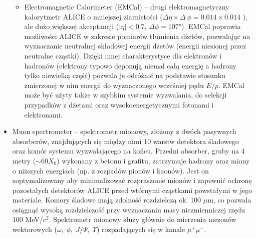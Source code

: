 \begin{itemize}
\begin{itemize}
		\item Electromagnetic Calorimeter (EMCal) -- drugi elektromagnetyczny kalorytmetr ALICE o mniejszej ziarnistości ($\Delta\eta\times\Delta~\phi = 0.014 \times 0.014$ ), ale dużo większej akceptancji ($|\eta| < 0.7$, $\Delta\phi = \ang{107}$).
EMCal poprawia możliwości ALICE w zakresie pomiarów tłumienia dżetów, pozwalając na wyznaczanie neutralnej składowej energii dżetów (energii niesionej przez neutralne cząstki). Dzięki innej charakterystyce dla elektronów i hadronów (elektrony typowo deponują niemal całą energię a hadrony tylko niewielką część) pozwala je odróżnić na podstawie stosunku zmierzonej w nim energii do wyznaczonego wcześniej pędu $E/p$.
EMCal może być użyty także w szybkim systemie wyzwalania, do selekcji przypadków z dżetami oraz wysokoenergetycznymi fotonami i elektronami.
	\end{itemize}
	\item Muon spectrometer -- spektrometr mionowy, złożony z dwóch pasywnych absorberów, znajdujących się między nimi 10 warstw detektora śladowego oraz komór systemu wyzwalającego na końcu. 
	Przedni absorber, gruby na 4 metry (${\sim}60 X_0$) wykonany z betonu i grafitu, zatrzymuje hadrony oraz miony o niższych energiach (np. z rozpadów pionów i kaonów). Jest on zoptymalizowany aby minimalizować rozpraszanie mionów i zapewnić ochronę pozostałych detektorów ALICE przed wtórnymi cząstkami powstałymi w jego materiale. 
Komory śladowe mają zdolność rozdzielczą ok. 100 $\mu$m, co pozwala osiągnąć wysoką rozdzielczość przy wyznaczaniu masy niezmienniczej rzędu 100 MeV/$c^2$.	Spektrometr mionowy służy głównie do mierzenia mezonów wektorowych ($\omega,\;\phi,\;J/\Psi,\;\Upsilon$) rozpadających się w kanale $\mu^+\mu^-$.
	

\end{itemize}
